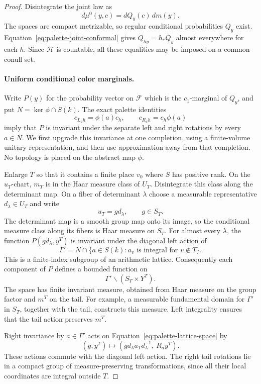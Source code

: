 \begin{proof}
Disintegrate the joint law as
\begin{equation}\label{eq:palette-disintegration}
 d\mu^0(y,c)=dQ_y(c)\,dm(y).
\end{equation}
The spaces are compact metrizable, so regular conditional probabilities
$Q_y$ exist. Equation~\ref{eq:palette-joint-conformal} gives
$Q_{hy}=h_*Q_y$ almost everywhere for each $h$. Since $\mathcal H$ is
countable, all these equalities may be imposed on a common conull set.

\paragraph{Uniform conditional color marginals.}
Write $P(y)$ for the probability vector on $\mathcal F$ which is the
$c_1$-marginal of $Q_y$, and put $N=\ker\phi\cap S(k)$.
The exact palette identities
\[
 c_{L_a h}=\phi(a)c_h,\qquad
 c_{R_a h}=c_h\phi(a)
\]
imply that $P$ is invariant under the separate left and right rotations
by every $a\in N$. We first upgrade this invariance at one completion,
using a finite-volume unitary representation, and then use approximation
away from that completion. No topology is placed on the abstract map
$\phi$.

Enlarge $T$ so that it contains a finite place $v_0$ where $S$ has
positive rank. On the $u_T$-chart, $m_T$ is in the Haar measure class
of $U_T$. Disintegrate this class along the determinant map. On a fiber
of determinant $\lambda$ choose a measurable representative
$d_\lambda\in U_T$ and write
\[
 u_T=g d_\lambda,\qquad g\in S_T.
\]
The determinant map is a smooth group map onto its image, so the
conditional measure class along its fibers is Haar measure on $S_T$.
For almost every $\lambda$, the function $P(gd_\lambda,y^T)$ is invariant
under the diagonal left action of
\[
 \Gamma'=N\cap\{a\in S(k):a_v\text{ is integral for }v\notin T\}.
\]
This is a finite-index subgroup of an arithmetic lattice. Consequently
each component of $P$ defines a bounded function on
\begin{equation}\label{eq:palette-lattice-space}
 \Gamma'\backslash(S_T\times Y^T).
\end{equation}
The space has finite invariant measure, obtained from Haar measure on
the group factor and $m^T$ on the tail. For example, a measurable
fundamental domain for $\Gamma'$ in $S_T$, together with the tail,
constructs this measure. Left integrality ensures that the tail action
preserves $m^T$.

Right invariance by $a\in\Gamma'$ acts on
Equation~\ref{eq:palette-lattice-space} by
\[
 (g,y^T)\longmapsto
 (g d_\lambda a_Td_\lambda^{-1},\ R_a y^T).
\]
These actions commute with the diagonal left action. The right tail
rotations lie in a compact group of measure-preserving transformations,
since all their local coordinates are integral outside $T$.


\end{proof}
